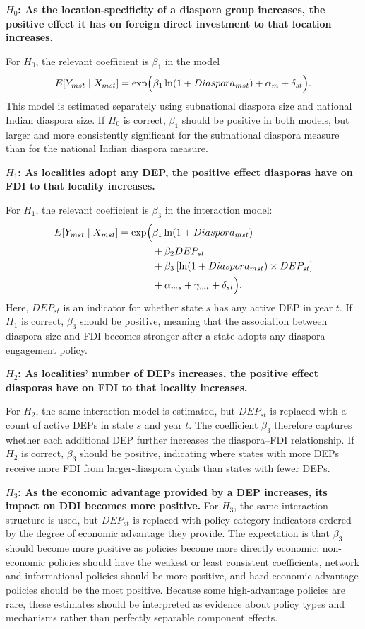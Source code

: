 \documentclass[doublespace,nopageskip]{UVAthesis}
\begin{document}
\textbf{$H_0$: As the location-specificity of a diaspora group increases, the positive effect it has on foreign direct investment to that location increases.}

For $H_0$, the relevant coefficient is $\beta_1$ in the model
\[
E[Y_{mst} \mid X_{mst}] =
\exp \Bigl(
\beta_1 \ln(1+Diaspora_{mst})
+ \alpha_{m}
+ \delta_{st}
\Bigr).
\]
This model is estimated separately using subnational diaspora size and national Indian diaspora size. If $H_0$ is correct, $\beta_1$ should be positive in both models, but larger and more consistently significant for the subnational diaspora measure than for the national Indian diaspora measure.

\textbf{$H_1$: As localities adopt any DEP, the positive effect diasporas have on FDI to that locality increases.}

For $H_1$, the relevant coefficient is $\beta_3$ in the interaction model:
\[
\begin{aligned}
E[Y_{mst} \mid X_{mst}] =
\exp \Bigl(
&\beta_1 \ln(1+Diaspora_{mst}) \\
&+ \beta_2 DEP_{st} \\
&+ \beta_3 \left[\ln(1+Diaspora_{mst}) \times DEP_{st}\right] \\
&+ \alpha_{ms}
+ \gamma_{mt}
+ \delta_{st}
\Bigr).
\end{aligned}
\]
Here, $DEP_{st}$ is an indicator for whether state $s$ has any active DEP in year $t$. If $H_1$ is correct, $\beta_3$ should be positive, meaning that the association between diaspora size and FDI becomes stronger after a state adopts any diaspora engagement policy.

\textbf{$H_2$: As localities' number of DEPs increases, the positive effect diasporas have on FDI to that locality increases.}

For $H_2$, the same interaction model is estimated, but $DEP_{st}$ is replaced with a count of active DEPs in state $s$ and year $t$. The coefficient $\beta_3$ therefore captures whether each additional DEP further increases the diaspora--FDI relationship. If $H_2$ is correct, $\beta_3$ should be positive, indicating where states with more DEPs receive more FDI from larger-diaspora dyads than states with fewer DEPs.

\textbf{$H_3$: As the economic advantage provided by a DEP increases, its impact on DDI becomes more positive.
}
For $H_3$, the same interaction structure is used, but $DEP_{st}$ is replaced with policy-category indicators ordered by the degree of economic advantage they provide. The expectation is that $\beta_3$ should become more positive as policies become more directly economic: non-economic policies should have the weakest or least consistent coefficients, network and informational policies should be more positive, and hard economic-advantage policies should be the most positive. Because some high-advantage policies are rare, these estimates should be interpreted as evidence about policy types and mechanisms rather than perfectly separable component effects.
\end{document}
